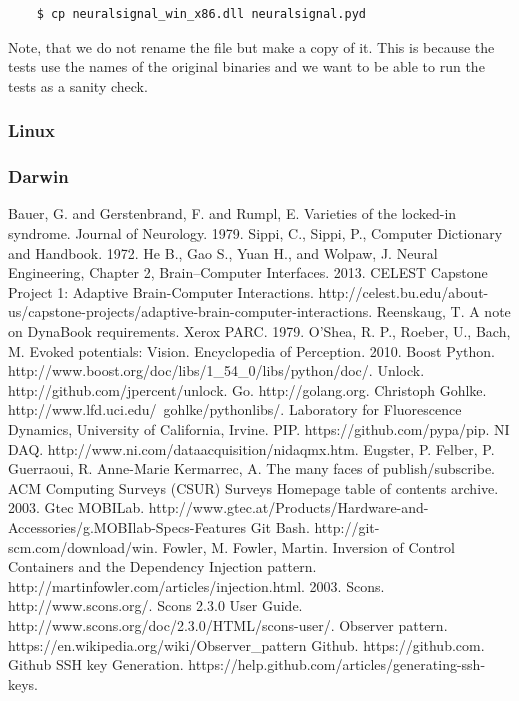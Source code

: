 \documentclass[11pt]{article}
\begin{document}
\begin{verbatim}
    $ cp neuralsignal_win_x86.dll neuralsignal.pyd
\end{verbatim}

Note, that we do not rename the file but make a copy of it.  This is because the tests use the names of the original binaries and we want to be able to run the tests as a sanity check.

\subsubsection{Linux}
\subsubsection{Darwin}

\begin{thebibliography}{99}
  Bauer, G. and Gerstenbrand, F. and Rumpl, E. Varieties of the locked-in syndrome. Journal of Neurology.  1979.
  Sippi, C.,  Sippi, P., Computer Dictionary and Handbook. 1972. 
  He B., Gao S., Yuan H., and Wolpaw, J.  Neural Engineering, Chapter 2, Brain–Computer Interfaces.  2013.
 CELEST Capstone Project 1: Adaptive Brain-Computer Interactions.  http://celest.bu.edu/about-us/capstone-projects/adaptive-brain-computer-interactions.
  Reenskaug, T. A note on DynaBook requirements. Xerox PARC.  1979.
 O’Shea, R. P., Roeber, U., Bach, M. Evoked potentials: Vision.  Encyclopedia of Perception. 2010.
 Boost Python.  http://www.boost.org/doc/libs/1\_54\_0/libs/python/doc/.
 Unlock.  http://github.com/jpercent/unlock.
 Go.  http://golang.org.
  Christoph Gohlke.  http://www.lfd.uci.edu/~gohlke/pythonlibs/.  Laboratory for Fluorescence Dynamics, University of California, Irvine.
 PIP.  https://github.com/pypa/pip.
 NI DAQ.  http://www.ni.com/dataacquisition/nidaqmx.htm.
 Eugster, P.  Felber, P.  Guerraoui, R.  Anne-Marie Kermarrec, A.  The many faces of publish/subscribe.  ACM Computing Surveys (CSUR) Surveys Homepage table of contents archive.  2003.
 Gtec MOBILab.  http://www.gtec.at/Products/Hardware-and-Accessories/g.MOBIlab-Specs-Features
 Git Bash.  http://git-scm.com/download/win.
 Fowler, M.  Fowler, Martin.  Inversion of Control Containers and the Dependency Injection pattern.  http://martinfowler.com/articles/injection.html.  2003.  
  Scons.  http://www.scons.org/.
 Scons 2.3.0 User Guide.  http://www.scons.org/doc/2.3.0/HTML/scons-user/.
 Observer pattern.  https://en.wikipedia.org/wiki/Observer\_pattern
  Github.  https://github.com.
 Github SSH key Generation.  https://help.github.com/articles/generating-ssh-keys.
\end{thebibliography}
\end{document}
